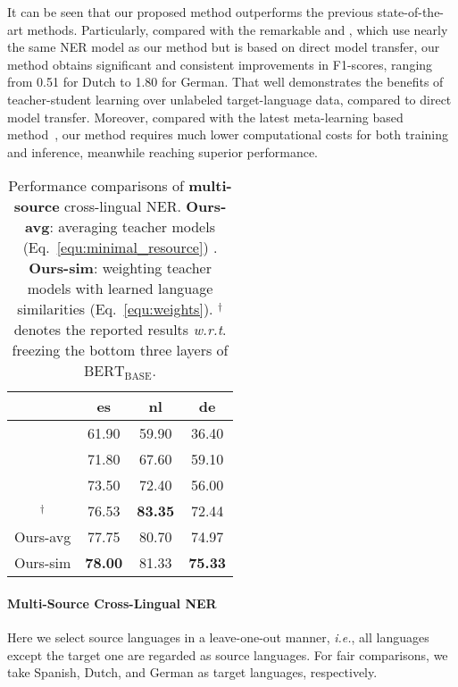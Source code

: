 \documentclass[11pt,a4paper]{article}
\newcommand\ie{\textit{i.e.}}
\newcommand\wrt{\textit{w.r.t}}
\begin{document}
	It can be seen that our proposed method outperforms the previous state-of-the-art methods. 
	Particularly, compared with the remarkable \citet{wu2019beto} and \citet{moon2019lingua}, which use nearly the same NER model as our method but is based on direct model transfer, our method obtains significant and consistent improvements in F1-scores, ranging from 0.51 for Dutch to 1.80 for German. That well demonstrates the benefits of teacher-student learning over unlabeled target-language data, compared to direct model transfer. 
	Moreover, compared with the latest meta-learning based method~\cite{wu2020enhanced}, our method requires much lower computational costs for both training and inference, meanwhile reaching superior performance.
	
	\begin{table}[t]
		\centering
		\begin{tabular}{c|c|c|c}
			\hline
			&	es	&	nl	&	de \\ \hline
			\citet{tackstrom2012nudging}& 61.90 & 59.90	& 36.40 \\ \hline
			\citet{rahimi2019massively}& 71.80 & 67.60 & 59.10 \\ \hline
			\citet{chen2019multi}& 73.50 & 72.40 & 56.00 \\ \hline
\citet{moon2019lingua}$^{\dag}$ & 76.53 & \textbf{83.35} & 72.44\\ \hline
			\hline
			Ours-avg & 77.75 & 80.70 & 74.97 \\ \hline
			Ours-sim & \textbf{78.00} & 81.33 & \textbf{75.33}\\ \hline
		\end{tabular}
		\caption{Performance comparisons of \textbf{multi-source} cross-lingual NER. 
\textbf{Ours-avg}: averaging teacher models (Eq.~\ref{equ:minimal_resource}) . \textbf{Ours-sim}: weighting teacher models with learned language similarities (Eq.~\ref{equ:weights}).
		$^{\dag}$ denotes the reported results \wrt. freezing the bottom three layers of $\text{BERT}_{\text{BASE}}$.
		}
		\label{tab:multi_source}
	\end{table}
	
	\paragraph{Multi-Source Cross-Lingual NER}
	Here we select source languages in a leave-one-out manner, \ie, all languages except the target one are regarded as source languages. For fair comparisons, we take Spanish, Dutch, and German as target languages, respectively. 
\end{document}
